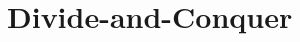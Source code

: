 \documentclass[../Solutions]{subfiles}
\begin{document}
	\section{Divide-and-Conquer}

	
	
\end{document}

